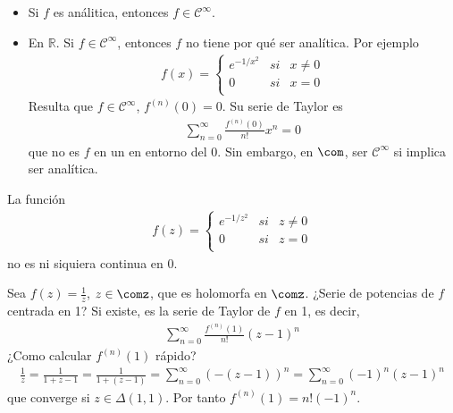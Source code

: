 \begin{obs}
\begin{itemize}
    \item Si $f$ es análitica, entonces $f \in \mathscr{C}^{\infty}$.
    \item En $\mathbb{R}$. Si $f \in \mathscr{C}^{\infty}$, entonces $f$ no tiene por qué ser analítica. Por ejemplo
    \begin{align*}
        f(x) = \left\{ \begin{array}{lcc}
            e^{-1/x^2} & si & x \not = 0 \\
            0 & si & x = 0\\
             \end{array}
        \right.
    \end{align*}
    Resulta que $f \in \mathscr{C}^{\infty}$, $f^{(n)}(0) = 0$. Su serie de Taylor es 
    \begin{align*}
        \sum_{n=0}^{\infty}{\frac{f^{(n)}(0)}{n!}x^n = 0}
    \end{align*}
    que no es $f$ en un en entorno del 0. Sin embargo, en $\com$, ser $\mathscr{C}^{\infty}$ si implica ser analítica.
\end{itemize}
\end{obs}

\begin{obs}
La función
\begin{align*}
        f(z) = \left\{ \begin{array}{lcc}
            e^{-1/z^2} & si & z \not = 0 \\
            0 & si & z = 0\\
             \end{array}
        \right.
    \end{align*}
    no es ni siquiera continua en 0.
\end{obs}

\begin{ejemplo}
Sea $f(z) = \frac{1}{z}$, $z \in \comz$, que es holomorfa en $\comz$. ¿Serie de potencias de $f$ centrada en 1? Si existe, es la serie de Taylor de $f$ en 1, es decir,
\begin{align*}
    \sum_{n=0}^{\infty}{\frac{f^{(n)}(1)}{n!}(z-1)^n}
\end{align*}
¿Como calcular $f^{(n)}(1)$ rápido?
\begin{align*}
    \frac{1}{z} = \frac{1}{1+z-1} = \frac{1}{1+(z-1)} = \sum_{n=0}^{\infty}{(-(z-1))^n} = \sum_{n=0}^{\infty}{(-1)^n(z-1)^n}
\end{align*}
que converge si $z \in \Delta(1,1)$. Por tanto $f^{(n)}(1) = n!(-1)^n$.
\end{ejemplo}

